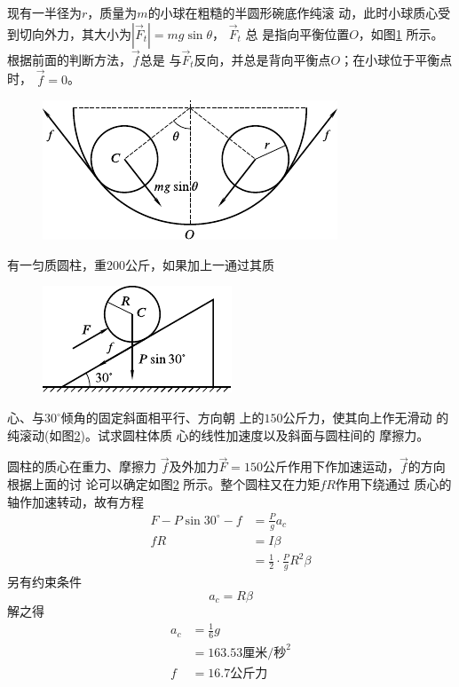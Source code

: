 现有一半径为$ r $，质量为$ m $的小球在粗糙的半圆形碗底作纯滚
动，此时小球质心受到切向外力，其大小为$ | \vec{F} _ t | = m g \sin \theta $， $ \vec{F} _ t $ 总
是指向平衡位置$ O $，如图\ref{fig:10.16} 所示。根据前面的判断方法，$\vec{f}$总是
与$ \vec{F} _ t $反向，并总是背向平衡点$ O $；在小球位于平衡点时， $ \vec{f} = 0 $。

\begin{figure}[h]
  \centering
  \includegraphics{figure/fig10.16}
  \caption{}
  \label{fig:10.16}
\end{figure}

\clearpage
\example 有一匀质圆柱，重$ 200 $公斤，如果加上一通过其质
\begin{figure}
  \centering
  \includegraphics{figure/fig10.17}
  \caption{}
  \label{fig:10.17}
\end{figure}
心、与$ 30^\circ $倾角的固定斜面相平行、方向朝
上的$ 150 $公斤力，使其向上作无滑动
的纯滚动(如图\ref{fig:10.17})。试求圆柱体质
心的线性加速度以及斜面与圆柱间的
摩擦力。

\solution 圆柱的质心在重力、摩擦力
$\vec{f}$及外加力$ \vec{F}=150 $公斤作用下作加速运动，$\vec{f}$的方向根据上面的讨
论可以确定如图\ref{fig:10.17} 所示。整个圆柱又在力矩$ fR $作用下绕通过
质心的轴作加速转动，故有方程
\begin{equation*}
  \begin{split}
    F - P \sin 3 0 ^ { \circ } - f &= \frac { P } { g } a _ { c } \\
    f R &= I \beta \\
    &= \frac { 1 } { 2 } \cdot \frac { P } { g } R ^ { 2 } \beta
  \end{split}
\end{equation*}
另有约束条件
\begin{equation*}
  a _ { c } = R \beta
\end{equation*}
解之得
\begin{equation*}
  \begin{split}
    a _ { c } &= \frac { 1 } { 6 } g \\
    &= 1 6 3 . 5 3 \text{厘米/秒} ^ 2 \\
    f &= 1 6 . 7 \text{公斤力}
  \end{split}
\end{equation*}

